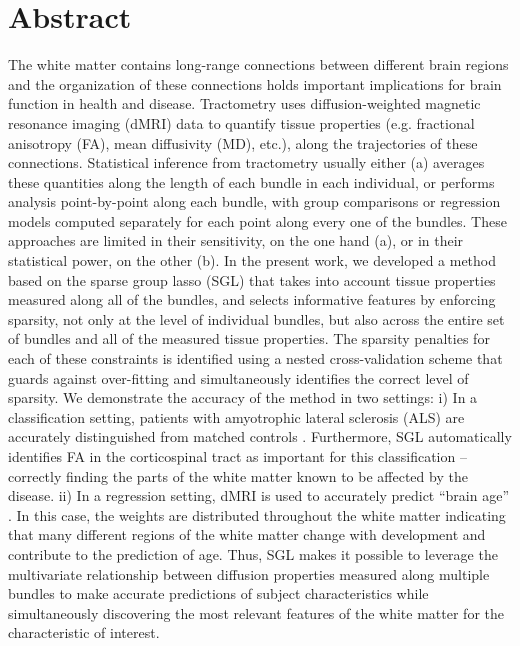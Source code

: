 \section*{Abstract}

The white matter contains long-range connections between different
brain regions and the organization of these connections holds important
implications for brain function in health and disease. Tractometry
uses diffusion-weighted magnetic resonance imaging (dMRI) data
to quantify tissue properties (e.g. fractional anisotropy (FA),
mean diffusivity (MD), etc.), along the trajectories of these
connections\cite{yeatman2012tract}. Statistical inference from
tractometry usually either (a) averages these quantities along
the length of each bundle in each individual, or performs analysis
point-by-point along each bundle, with group comparisons or regression
models computed separately for each point along every one of the bundles.
These approaches are limited in their sensitivity, on the one hand (a), or
in their statistical power, on the other (b).
In the present work, we developed a method based on the sparse group
lasso (SGL) \cite{simon2013sparse} that takes into account tissue
properties measured along all of the bundles, and selects informative
features by enforcing sparsity, not only at the level of individual
bundles, but also across the entire set of bundles and all of the measured
tissue properties. The sparsity penalties for each of these constraints
is identified using a nested cross-validation scheme that guards
against over-fitting and simultaneously identifies the correct
level of sparsity. We demonstrate the accuracy of the method in two
settings: i) In a classification setting, patients with amyotrophic
lateral sclerosis (ALS) are accurately distinguished from matched
controls \cite{sarica2017corticospinal}. Furthermore, SGL automatically
identifies FA in the corticospinal tract as important for this
classification -- correctly finding the parts of the white matter known
to be affected by the disease. ii) In a regression setting, dMRI is
used to accurately predict ``brain age'' \cite{yeatman2014lifespan,
Brown2012-so}. In this case, the weights are distributed throughout the
white matter indicating that many different regions of the white matter
change with development and contribute to the prediction of age. Thus,
SGL makes it possible to leverage the multivariate relationship between
diffusion properties measured along multiple bundles to make accurate
predictions of subject characteristics while simultaneously discovering
the most relevant features of the white matter for the characteristic of
interest.
